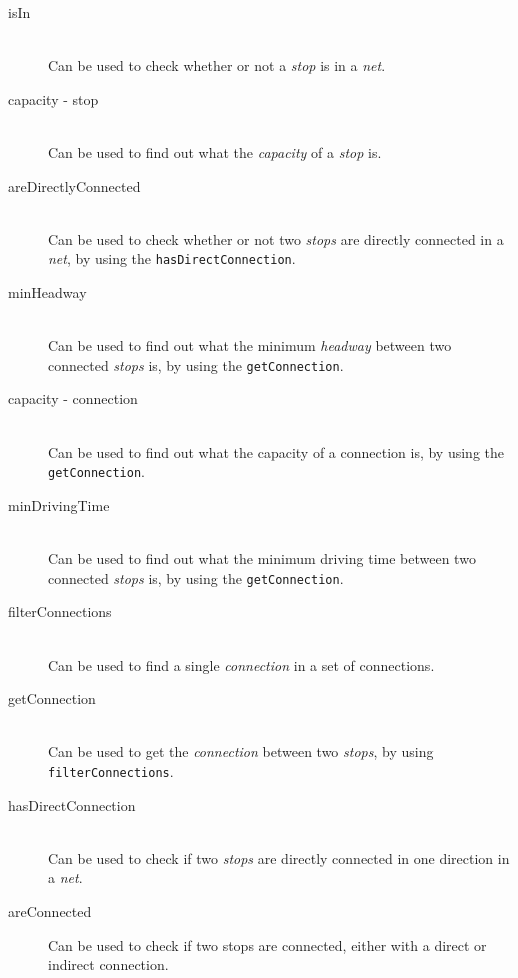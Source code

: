 \documentclass[a4]{article}
\begin{document}
\begin{description}
    \item[isIn] \hfill \\ Can be used to check whether or not a \emph{stop} is in a \emph{net}.
    \item[capacity - stop] \hfill \\ Can be used to find out what the \emph{capacity} of a \emph{stop} is.
    \item[areDirectlyConnected] \hfill \\ Can be used to check whether or not two \emph{stops} are directly connected in a \emph{net}, by using the \verb=hasDirectConnection=.
    \item[minHeadway] \hfill \\ Can be used to find out what the minimum \emph{headway} between two connected \emph{stops} is, by using the \verb=getConnection=.
    \item[capacity - connection] \hfill \\ Can be used to find out what the capacity of a connection is, by using the \verb=getConnection=.
    \item[minDrivingTime] \hfill \\ Can be used to find out what the minimum driving time between two connected \emph{stops} is, by using the \verb=getConnection=.
    \item[filterConnections] \hfill \\ Can be used to find a single \emph{connection} in a set of connections.
    \item[getConnection] \hfill \\ Can be used to get the \emph{connection} between two \emph{stops}, by using \verb=filterConnections=.
    \item[hasDirectConnection] \hfill \\ Can be used to check if two \emph{stops} are directly connected in one direction in a \emph{net}.
    \item[areConnected] Can be used to check if two stops are connected, either with a direct or indirect connection.
\end{description}  
\end{document}
